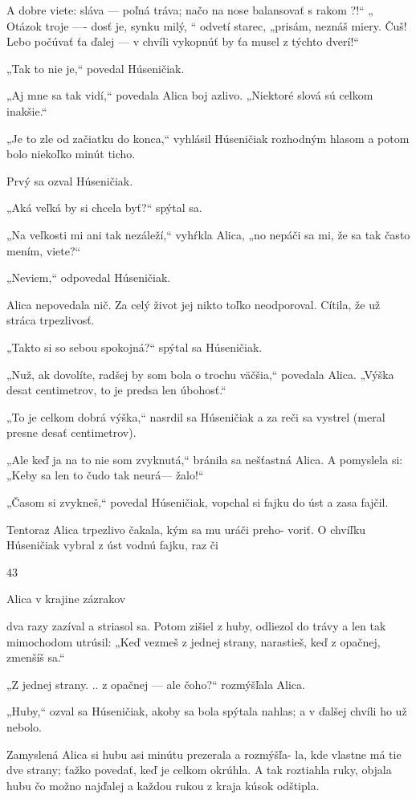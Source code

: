 \documentclass[12pt]{book}
\begin{document}
\begin{Parallel}[p]{}{}
{A dobre viete: sláva — poľná tráva;
načo na nose balansovať s rakom ?!“
„ Otázok troje —- dosť je, synku milý, “
odvetí starec, „prisám, neznáš miery.
Čuš! Lebo počúvať ťa ďalej — v chvíli
vykopnúť by ťa musel z týchto dverí!“

„Tak to nie je,“ povedal Húseničiak.

„Aj mne sa tak vidí,“ povedala Alica boj azlivo. „Niektoré
slová sú celkom inakšie.“

„Je to zle od začiatku do konca,“ vyhlásil Húseničiak
rozhodným hlasom a potom bolo niekoľko minút ticho.

Prvý sa ozval Húseničiak.

„Aká veľká by si chcela byť?“ spýtal sa.

„Na veľkosti mi ani tak nezáleží,“ vyhŕkla Alica, „no
nepáči sa mi, že sa tak často mením, viete?“

„Neviem,“ odpovedal Húseničiak.

Alica nepovedala nič. Za celý život jej nikto toľko
neodporoval. Cítila, že už stráca trpezlivosť.

„Takto si so sebou spokojná?“ spýtal sa Húseničiak.

„Nuž, ak dovolíte, radšej by som bola o trochu väčšia,“
povedala Alica. „Výška desat centimetrov, to je predsa len
úbohosť.“

„To je celkom dobrá výška,“ nasrdil sa Húseničiak a za
reči sa vystrel (meral presne desať centimetrov).

„Ale keď ja na to nie som zvyknutá,“ bránila sa nešťastná
Alica. A pomyslela si: „Keby sa len to čudo tak neurá—
žalo!“

„Časom si zvykneš,“ povedal Húseničiak, vopchal si fajku
do úst a zasa fajčil.

Tentoraz Alica trpezlivo čakala, kým sa mu uráči preho-
voriť. O chvíľku Húseničiak vybral z úst vodnú fajku, raz či

43

Alica v krajine zázrakov

dva razy zazíval a striasol sa. Potom zišiel z huby, odliezol do
trávy a len tak mimochodom utrúsil: „Keď vezmeš z jednej
strany, narastieš, keď z opačnej, zmenšíš sa.“

„Z jednej strany. .. z opačnej — ale čoho?“ rozmýšľala
Alica.

„Huby,“ ozval sa Húseničiak, akoby sa bola spýtala
nahlas; a v ďalšej chvíli ho už nebolo.

Zamyslená Alica si hubu asi minútu prezerala a rozmýšľa-
la, kde vlastne má tie dve strany; ťažko povedať, keď je
celkom okrúhla. A tak roztiahla ruky, objala hubu čo možno
najďalej a každou rukou z kraja kúsok odštipla.

}
\end{Parallel}
\end{document}
